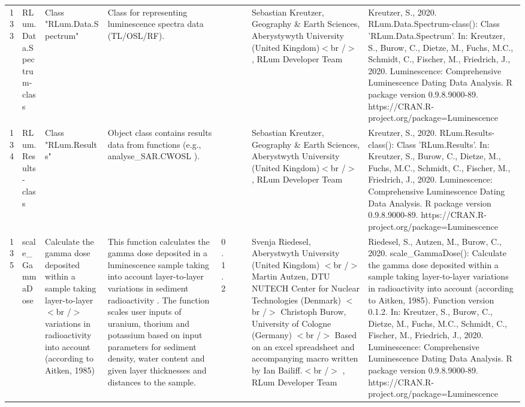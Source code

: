 \begin{table}[ht]
\begin{tabular}{rllllllll}
 \\ 
  133 & RLum.Data.Spectrum-class & Class  "RLum.Data.Spectrum" & Class for representing luminescence spectra data (TL/OSL/RF). &  &  &  & Sebastian Kreutzer, Geography \& Earth Sciences, Aberystywyth University (United Kingdom)$<$br /$>$ , RLum Developer Team & Kreutzer, S., 2020. RLum.Data.Spectrum-class(): Class 'RLum.Data.Spectrum'. In: Kreutzer, S., Burow, C., Dietze, M., Fuchs, M.C., Schmidt, C., Fischer, M., Friedrich, J., 2020. Luminescence: Comprehensive Luminescence Dating Data Analysis. R package version 0.9.8.9000-89. https://CRAN.R-project.org/package=Luminescence
 \\ 
  134 & RLum.Results-class & Class  "RLum.Results" & Object class contains results data from functions (e.g.,  analyse\_SAR.CWOSL ). &  &  &  & Sebastian Kreutzer, Geography \& Earth Sciences, Aberystwyth University (United Kingdom)$<$br /$>$ , RLum Developer Team & Kreutzer, S., 2020. RLum.Results-class(): Class 'RLum.Results'. In: Kreutzer, S., Burow, C., Dietze, M., Fuchs, M.C., Schmidt, C., Fischer, M., Friedrich, J., 2020. Luminescence: Comprehensive Luminescence Dating Data Analysis. R package version 0.9.8.9000-89. https://CRAN.R-project.org/package=Luminescence
 \\ 
  135 & scale\_GammaDose & Calculate the gamma dose deposited within a sample taking layer-to-layer$<$br /$>$ variations in radioactivity into account (according to Aitken, 1985) & This function calculates the gamma dose deposited in a luminescence sample taking into account layer-to-layer variations in sediment radioactivity . The function scales user inputs of uranium, thorium and potassium based on input parameters for sediment density, water content and given layer thicknesses and distances to the sample. & 0.1.2
 &  &  & Svenja Riedesel, Aberystwyth University (United Kingdom)  $<$br /$>$ Martin Autzen, DTU NUTECH Center for Nuclear Technologies (Denmark)  $<$br /$>$ Christoph Burow, University of Cologne (Germany)  $<$br /$>$ Based on an excel spreadsheet and accompanying macro written by Ian Bailiff.$<$br /$>$ , RLum Developer Team & Riedesel, S., Autzen, M., Burow, C., 2020. scale\_GammaDose(): Calculate the gamma dose deposited within a sample taking layer-to-layer variations in radioactivity into account (according to Aitken, 1985). Function version 0.1.2. In: Kreutzer, S., Burow, C., Dietze, M., Fuchs, M.C., Schmidt, C., Fischer, M., Friedrich, J., 2020. Luminescence: Comprehensive Luminescence Dating Data Analysis. R package version 0.9.8.9000-89. https://CRAN.R-project.org/package=Luminescence

\end{tabular}
\end{table}
